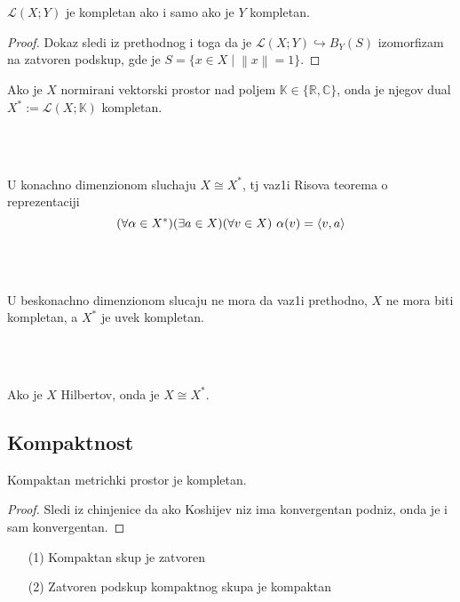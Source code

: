 \documentclass[a4paper,12pt]{article}
\newcommand{\RR}{\mathbb{R}}
\newcommand{\CC}{\mathbb{C}}
\newcommand{\norm}[1]{\left\lVert#1\right\rVert}
\begin{document}
\begin{posl}
$\mathcal{L}(X;Y)$ je kompletan ako i samo ako je $Y$ kompletan.
\end{posl}

\begin{proof}
Dokaz sledi iz prethodnog i toga da je $\mathcal{L}(X;Y)\hookrightarrow B_Y(S)$ izomorfizam na zatvoren podskup,  gde je $S = \{x \in X \mid \norm{x} = 1 \}$.
\end{proof}

\begin{nap} Ako je $X$ normirani vektorski prostor nad poljem $\mathbb{K} \in \{\RR, \CC \}$, onda je njegov dual $X^* := \mathcal{L} (X; \mathbb{K})$ kompletan.
\end{nap}
\\ \\
\begin{nap}
U konachno dimenzionom sluchaju $X \cong X^*$, tj vaz1i Risova teorema o re\-pre\-zen\-ta\-ci\-ji
\[(\forall \alpha \in X^*) (\exists a \in X) (\forall v \in X) \hspace{0.12cm} \alpha(v) = \langle v, a \rangle \]
\end{nap}
\\ \\
\begin{nap}
U beskonachno dimenzionom slucaju ne mora da vaz1i prethodno, $X$ ne mora biti kompletan, a $X^*$ je uvek kompletan.
\end{nap}
\\ \\
\begin{nap}
Ako je $X$ Hilbertov, onda je $X \cong X^*$.
\end{nap}

\subsection{Kompaktnost}

\begin{tvr}
Kompaktan metrichki prostor je kompletan.
\end{tvr}
\begin{proof}
Sledi iz chinjenice da ako Koshijev niz ima konvergentan podniz, onda je i sam konvergentan.
\end{proof}

\begin{tvr}
\begin{itemize}
\item[(1)] Kompaktan skup je zatvoren
\item[(2)] Zatvoren podskup kompaktnog skupa je kompaktan
\end{itemize}
\end{tvr}
\end{document}
